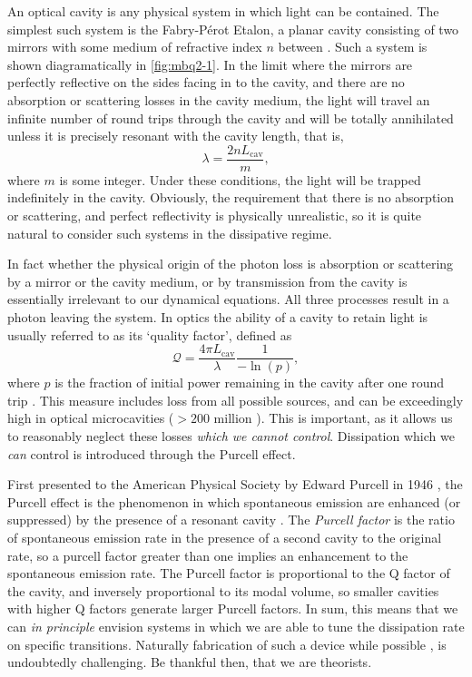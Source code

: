 An optical cavity is any physical system in which light can be contained. The simplest such system is the Fabry-P\'{e}rot Etalon, a planar cavity consisting of two mirrors with some medium of refractive index \(n\) between \cite{PF1899,Fox_OC}. Such a system is shown diagramatically in \cref{fig:mbq2-1}. In the limit where the mirrors are perfectly reflective on the sides facing in to the cavity, and there are no absorption or scattering losses in the cavity medium, the light will travel an infinite number of round trips through the cavity and will be totally annihilated unless it is precisely resonant with the cavity length, that is,
\begin{equation}
	\lambda = \frac{2nL_{\mathrm{cav}}}{m},
	\label{eq:mbq2-2}
\end{equation}
where \(m\) is some integer. Under these conditions, the light will be trapped indefinitely in the cavity. Obviously, the requirement that there is no absorption or scattering, and perfect reflectivity is physically unrealistic, so it is quite natural to consider such systems in the dissipative regime.

In fact whether the physical origin of the photon loss is absorption or scattering by a mirror or the cavity medium, or by transmission from the cavity is essentially irrelevant to our dynamical equations. All three processes result in a photon leaving the system. In optics the ability of a cavity to retain light is usually referred to as its `quality factor', defined as
\begin{equation}
	\mathcal{Q} = \frac{4\pi L_{\mathrm{cav}}}{\lambda} \frac{1}{-\ln(p)},
	\label{eq:mbq2-3}
\end{equation}
where \(p\) is the fraction of initial power remaining in the cavity after one round trip \cite{Siegman_chp11}. This measure includes loss from all possible sources, and can be exceedingly high in optical microcavities (\(>200\) million \cite{YOLYYV17}). This is important, as it allows us to reasonably neglect these losses \emph{which we cannot control}. Dissipation which we \emph{can} control is introduced through the Purcell effect.

First presented to the American Physical Society by Edward Purcell in 1946 \cite{Purcell46}, the Purcell effect is the phenomenon in which spontaneous emission are enhanced (or suppressed) by the presence of a resonant cavity \cite{Fox_Purcell}. The \emph{Purcell factor} is the ratio of spontaneous emission rate in the presence of a second cavity to the original rate, so a purcell factor greater than one implies an enhancement to the spontaneous emission rate. The Purcell factor is proportional to the Q factor of the cavity, and inversely proportional to its modal volume, so smaller cavities with higher Q factors generate larger Purcell factors. In sum, this means that we can \emph{in principle} envision systems in which we are able to tune the dissipation rate on specific transitions. Naturally fabrication of such a device while possible \cite{GSGLCTM98}, is undoubtedly challenging. Be thankful then, that we are theorists.   

